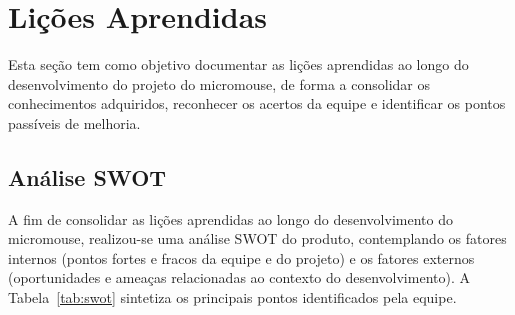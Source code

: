 \chapter{Lições Aprendidas}

Esta seção tem como objetivo documentar as lições aprendidas ao longo do desenvolvimento do projeto do micromouse, de forma a consolidar os conhecimentos adquiridos, reconhecer os acertos da equipe e identificar os pontos passíveis de melhoria.

\section{Análise SWOT}

A fim de consolidar as lições aprendidas ao longo do desenvolvimento do micromouse, realizou-se uma análise SWOT do produto, contemplando os fatores internos (pontos fortes e fracos da equipe e do projeto) e os fatores externos (oportunidades e ameaças relacionadas ao contexto do desenvolvimento). A Tabela~\ref{tab:swot} sintetiza os principais pontos identificados pela equipe.

